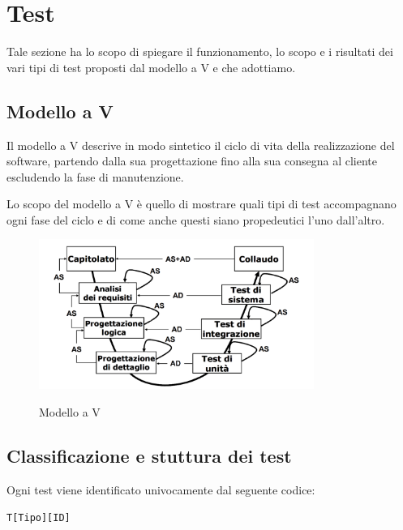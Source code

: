 \section{Test} \label{test}

Tale sezione ha lo scopo di spiegare il funzionamento, lo scopo e i risultati dei vari tipi di test proposti dal modello a V e che adottiamo.

\subsection{Modello a V} \label{sezionemodelloV}
Il modello a V descrive in modo sintetico il ciclo di vita della realizzazione del software, partendo dalla sua progettazione fino alla sua consegna al cliente escludendo la fase di manutenzione.

Lo scopo del modello a V è quello di mostrare quali tipi di test accompagnano ogni fase del ciclo e di come anche questi siano propedeutici l'uno dall'altro.

\begin{figure}[H]
	\centering
	\includegraphics[width=0.8\textwidth]{img/modellov-sweki_inv.png}
	\label{img:vmodel}
	\caption[Modello a V]{Modello a V\protect\footnotemark}
\end{figure}


\subsection{Classificazione e stuttura dei test} \label{classificazionetest}
Ogni test viene identificato univocamente dal seguente codice:

\begin{center}
	\texttt{T[Tipo][ID]}
\end{center}

